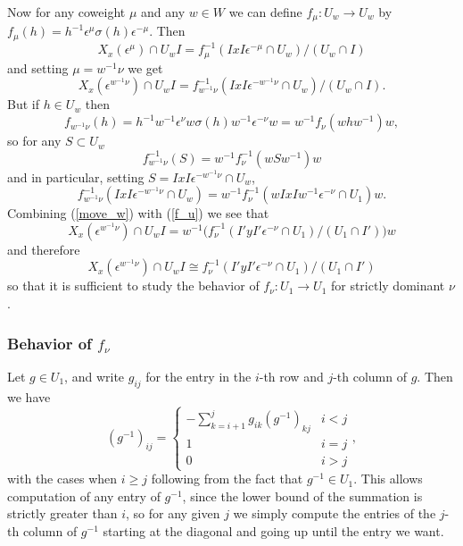 \documentclass{amsart}
\theoremstyle{definition}
\def\e{\epsilon}
\def\s{\sigma}
\def\en{\e^{\nu}}
\def\enm{\e^{-\nu}}
\def\emu{\e^{\mu}}
\def\enmu{\e^{-\mu}}
\def\Xw{X_x(\e^{w^{-1}\nu})}
\def\f{f_\nu}
\begin{document}
  Now for any coweight $\mu$ and any $w \in W$ we can define $f_\mu : U_w \to
  U_w$ by $f_\mu(h) = h^{-1}\emu\s(h)\enmu$.  Then
  \begin{equation*}
    X_x(\emu) \cap U_w I = f_\mu^{-1}(IxI\enmu \cap U_w)/(U_w \cap I)
  \end{equation*}
  and setting $\mu = w^{-1}\nu$ we get
  \begin{equation}
    \label{f_u}
    \Xw \cap U_w I = f_{w^{-1}\nu}^{-1}(IxI\e^{-w^{-1}\nu} \cap U_w)/(U_w \cap I).
  \end{equation}
  But if $h \in U_w$ then
  \begin{equation*}
    f_{w^{-1}\nu}(h) = h^{-1} w^{-1} \en w \s(h) w^{-1}
    \enm w = w^{-1} \f(whw^{-1}) w,
  \end{equation*}
  so for any $S \subset U_w$ 
  \begin{equation*}
    f^{-1}_{w^{-1}\nu}(S) = w^{-1}\f^{-1}(wSw^{-1})w
  \end{equation*}
  and in particular, setting $S = IxI\e^{-w^{-1}\nu} \cap U_w$,
  \begin{equation}
    \label{move_w}
    f_{w^{-1}\nu}^{-1}(IxI\e^{-w^{-1}\nu} \cap U_w) =
    w^{-1}\f^{-1}(wIxIw^{-1}\enm
    \cap U_1) w.
  \end{equation}
  Combining (\ref{move_w}) with (\ref{f_u}) we see that
  \begin{equation}
    \Xw \cap U_w I = w^{-1} \bigl( \f^{-1}(I'yI'\enm \cap U_1) / (U_1 \cap
    I') \bigr) w
  \end{equation}
  and therefore
  \begin{equation}
    \label{eq:f_nu_isomorphism}
    \Xw \cap U_w I \cong \f^{-1}(I'yI'\enm \cap U_1) / (U_1 \cap I') 
  \end{equation}
  so that it is sufficient to study the behavior of $\f : U_1 \to U_1$ for
  strictly dominant $\nu$.

  \subsubsection{Behavior of $\f$}
  Let $g \in U_1$, and write $g_{ij}$ for the entry in the $i$-th row and
  $j$-th column of $g$.  Then we have
  \begin{equation}
    \label{eq:inverse}
    (g^{-1})_{ij} = \begin{cases}
      -\sum_{k = i + 1}^j g_{ik}(g^{-1})_{kj} & i < j \\
      1 & i = j \\
      0 & i > j
    \end{cases},
  \end{equation}
  with the cases when $i \ge j$ following from the fact that $g^{-1} \in U_1$.
  This allows computation of any entry of $g^{-1}$, since the lower bound of
  the summation is strictly greater than $i$, so for any given $j$ we simply
  compute the entries of the $j$-th column of $g^{-1}$ starting at the diagonal
  and going up until the entry we want.
\end{document}
